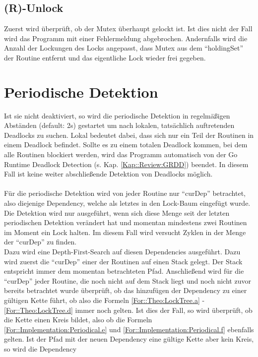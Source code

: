 \subsection{(R)-Unlock}
Zuerst wird überprüft, ob der Mutex überhaupt gelockt ist. Ist dies nicht der 
Fall wird das Programm mit einer Fehlermeldung abgebrochen. Andernfalls
wird die Anzahl der Lockungen des Locks angepasst, dass Mutex aus dem 
``holdingSet'' der Routine entfernt und das eigentliche Lock wieder frei gegeben.

\section{Periodische Detektion} \label{Kap::Implementation:Periodical}
Ist sie nicht deaktiviert, so wird die periodische Detektion in regelmäßigen 
Abständen (default: 2s) gestartet
um nach lokalen, tatsächlich auftretenden Deadlocks zu suchen. Lokal bedeutet 
dabei, dass sich nur ein Teil der Routinen in einem Deadlock befindet. Sollte 
es zu einem totalen Deadlock kommen, bei dem alle Routinen blockiert werden, 
wird das Programm automatisch von der Go Runtime Deadlock Detection (s. Kap. \ref{Kap::Review:GRDD})
beendet. In 
diesem Fall ist keine weiter abschließende Detektion von Deadlocks möglich.\\\\
Für die periodische Detektion wird von jeder Routine nur ``curDep'' betrachtet,
also diejenige Dependency, welche als letztes in den Lock-Baum eingefügt wurde. 
Die Detektion wird nur ausgeführt, wenn sich diese Menge seit der letzten 
periodischen Detektion verändert hat und momentan mindestens zwei Routinen im 
Moment ein Lock halten.
Im diesem Fall wird versucht Zyklen in der Menge der ``curDep'' zu finden.\\
Dazu wird eine Depth-First-Search auf diesen Dependencies ausgeführt. Dazu wird 
zuerst die ``curDep'' einer der Routinen auf einen Stack gelegt. Der Stack 
entspricht immer dem momentan betrachteten Pfad. Anschließend wird für 
die ``curDep'' jeder Routine, die noch nicht auf dem Stack liegt und noch 
nicht zuvor bereits betrachtet wurde überprüft,
ob das hinzufügen der Dependency zu einer gültigen Kette führt, ob also 
die Formeln \eqref{For::Theo:LockTree.a} - \eqref{For::Theo:LockTree.d} immer noch 
gelten. Ist dies der Fall, so wird überprüft, ob die Kette einen Kreis 
bildet, also ob die Formeln \eqref{For::Implementation:Periodical.e} und 
\eqref{For::Implementation:Periodical.f} ebenfalls gelten. Ist der Pfad mit der 
neuen Dependency eine gültige Kette aber kein Kreis, so wird die Dependency

